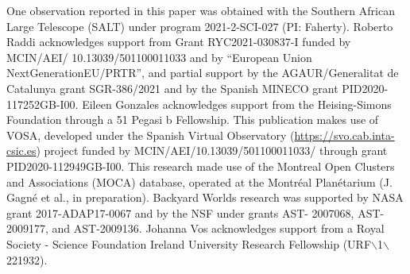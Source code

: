 \documentclass[twocolumn,tighten,twocolappendix]{aastex631}
\begin{document}
One observation reported in this paper was obtained with the Southern African Large Telescope (SALT) under program 2021-2-SCI-027 (PI: Faherty).
Roberto Raddi acknowledges support from Grant RYC2021-030837-I funded by MCIN/AEI/ 10.13039/501100011033 and by “European Union NextGenerationEU/PRTR”,
and partial support by the AGAUR/Generalitat de Catalunya grant SGR-386/2021 and by the Spanish MINECO grant PID2020-117252GB-I00.
Eileen Gonzales acknowledges support from the Heising-Simons Foundation through a 51 Pegasi b Fellowship.
This publication makes use of VOSA, developed under the Spanish Virtual Observatory (\url {https://svo.cab.inta-csic.es}) project funded by MCIN/AEI/10.13039/501100011033/ through grant PID2020-112949GB-I00. This research made use of the Montreal Open Clusters and Associations (MOCA) database, operated at the Montr\'eal Plan\'etarium (J. Gagn\'e et al., in preparation).
Backyard Worlds research was supported by NASA grant 2017-ADAP17-0067 and by the NSF under grants AST- 2007068, AST-2009177, and AST-2009136. 
Johanna Vos acknowledges support from a Royal Society - Science Foundation Ireland University Research Fellowship (URF$\backslash$1$\backslash$221932).


\pagebreak



\end{document}
